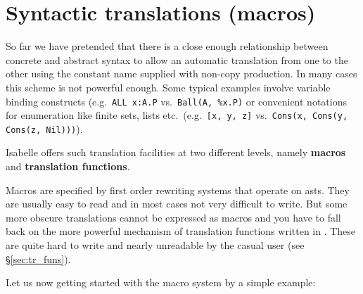 \section{Syntactic translations (macros)} \label{sec:macros}

So far we have pretended that there is a close enough relationship between
concrete and abstract syntax to allow an automatic translation from one to
the other using the constant name supplied with non-copy production. In many
cases this scheme is not powerful enough. Some typical examples involve
variable binding constructs (e.g.\ {\tt ALL x:A.P} vs.\ {\tt Ball(A, \%x.P)}
or convenient notations for enumeration like finite sets, lists etc.\ (e.g.\
{\tt [x, y, z]} vs.\ {\tt Cons(x, Cons(y, Cons(z, Nil)))}).

Isabelle offers such translation facilities at two different levels, namely
{\bf macros}\indexbold{macro} and {\bf translation functions}.

Macros are specified by first order rewriting systems that operate on asts.
They are usually easy to read and in most cases not very difficult to write.
But some more obscure translations cannot be expressed as macros and you have
to fall back on the more powerful mechanism of translation functions written
in \ML. These are quite hard to write and nearly unreadable by the casual
user (see \S\ref{sec:tr_funs}).

\medskip
Let us now getting started with the macro system by a simple example:

